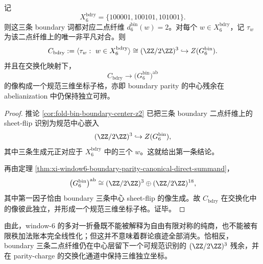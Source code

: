 \begin{proposition}\label{prop:xi-time-part60ab3-window6-boundary-center-residual}
记
\[
X_6^{\mathrm{bdry}}=\{100001,100101,101001\}.
\]
则这三条 boundary 词都对应二点纤维 \(d_6^{\mathrm{bin}}(w)=2\)。对每个 \(w\in X_6^{\mathrm{bdry}}\)，记 \(\tau_w\) 为该二点纤维上的唯一非平凡对合。则
\[
C_{\mathrm{bdry}}
:=
\langle \tau_w:\ w\in X_6^{\mathrm{bdry}}\rangle
\cong
(\ZZ/2\ZZ)^3
\hookrightarrow
Z(G_6^{\mathrm{bin}}).
\]
并且在交换化映射下，
\[
C_{\mathrm{bdry}}\longrightarrow \bigl(G_6^{\mathrm{bin}}\bigr)^{\mathrm{ab}}
\]
的像构成一个规范三维坐标子格，亦即 boundary parity 的中心残余在 abelianization 中仍保持独立可辨。
\end{proposition}
\begin{proof}
推论 \ref{cor:fold-bin-boundary-center-z2} 已把三条 boundary 二点纤维上的 sheet-flip 识别为规范中心嵌入
\[
(\ZZ/2\ZZ)^3\hookrightarrow Z(G_6^{\mathrm{bin}}),
\]
其中三条生成元正对应于 \(X_6^{\mathrm{bdry}}\) 中的三个 \(w\)。这就给出第一条结论。

再由定理 \ref{thm:xi-window6-boundary-parity-canonical-direct-summand}，
\[
\bigl(G_6^{\mathrm{bin}}\bigr)^{\mathrm{ab}}
\cong
(\ZZ/2\ZZ)^3\oplus (\ZZ/2\ZZ)^{18},
\]
其中第一因子恰由 boundary 三条中心 sheet-flip 的像生成。故 \(C_{\mathrm{bdry}}\) 在交换化中的像彼此独立，并形成一个规范三维坐标子格。证毕。
\end{proof}

\noindent
由此，window-\(6\) 的多对一折叠既不能被解释为自由有限对称的纯商，也不能被有限秩加法账本完全线性化；但这并不意味着群论痕迹全部消失。恰相反，boundary 三条二点纤维仍在中心层留下一个可规范识别的 \((\ZZ/2\ZZ)^3\) 残余，并在 parity-charge 的交换化通道中保持三维独立坐标。

\endinput
